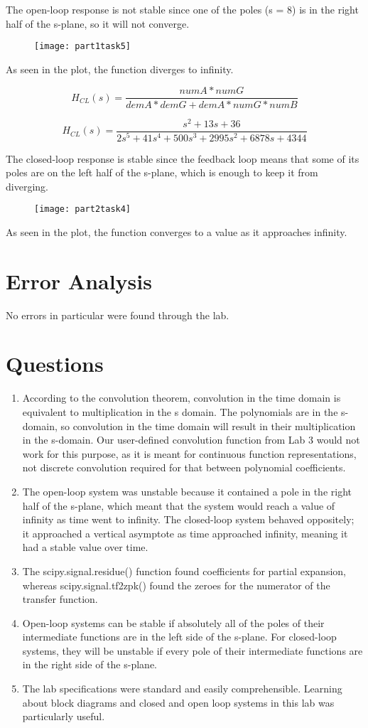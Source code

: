\documentclass[11pt,a4,titlepage]{article}
\begin{document}
The open-loop response is not stable since one of the poles (s = 8) is in the right half of the s-plane, so it will not converge.
\begin{figure}[H]
	\centering
	\texttt{[image: part1task5]}
\end{figure}
As seen in the plot, the function diverges to infinity.

\[H_{CL}(s) = \frac{numA*numG}{demA * demG + demA * numG * numB}\]

\[H_{CL}(s) = \frac{s^2+13s+36}{2s^5+41s^4+500s^3+2995s^2+6878s+4344}\]

The closed-loop response is stable since the feedback loop means that some of its poles are on the left half of the s-plane, which is enough to keep it from diverging.

\begin{figure}[H]
	\centering
	\texttt{[image: part2task4]}
\end{figure}
As seen in the plot, the function converges to a value as it approaches infinity.

\section{Error Analysis}
No errors in particular were found through the lab.

\section{Questions}
\begin{enumerate}
	\item According to the convolution theorem, convolution in the time domain is equivalent to multiplication in the s domain. The polynomials are in the s-domain, so convolution in the time domain will result in their multiplication in the s-domain. Our user-defined convolution function from Lab 3 would not work for this purpose, as it is meant for continuous function representations, not discrete convolution required for that between polynomial coefficients.
	\item The open-loop system was unstable because it contained a pole in the right half of the s-plane, which meant that the system would reach a value of infinity as time went to infinity. The closed-loop system behaved oppositely; it approached a vertical asymptote as time approached infinity, meaning it had a stable value over time.
	\item The scipy.signal.residue() function found coefficients for partial expansion, whereas scipy.signal.tf2zpk() found the zeroes for the numerator of the transfer function.
	\item Open-loop systems can be stable if absolutely all of the poles of their intermediate functions are in the left side of the s-plane. For closed-loop systems, they will be unstable if every pole of their intermediate functions are in the right side of the s-plane.
	\item The lab specifications were standard and easily comprehensible. Learning about block diagrams and closed and open loop systems in this lab was particularly useful.
\end{enumerate}
\end{document}
